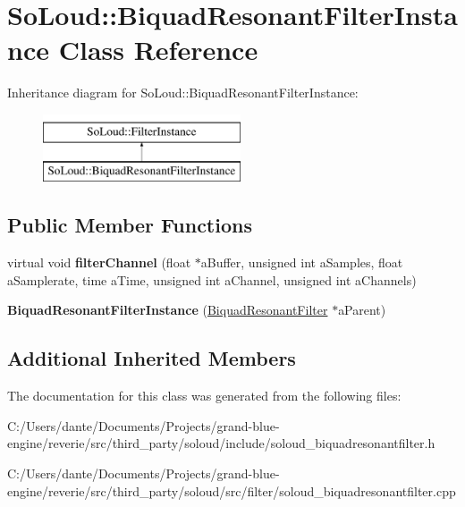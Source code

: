 \hypertarget{class_so_loud_1_1_biquad_resonant_filter_instance}{}\section{So\+Loud\+::Biquad\+Resonant\+Filter\+Instance Class Reference}
\label{class_so_loud_1_1_biquad_resonant_filter_instance}
Inheritance diagram for So\+Loud\+::Biquad\+Resonant\+Filter\+Instance\+:\begin{figure}[H]
\begin{center}
\leavevmode
\includegraphics[height=2.000000cm]{class_so_loud_1_1_biquad_resonant_filter_instance}
\end{center}
\end{figure}
\subsection*{Public Member Functions}
\begin{DoxyCompactItemize}
\item 
\mbox{\label{class_so_loud_1_1_biquad_resonant_filter_instance_a1252db79c00fe979dfafadb534d4c367}} 
virtual void {\bfseries filter\+Channel} (float $\ast$a\+Buffer, unsigned int a\+Samples, float a\+Samplerate, time a\+Time, unsigned int a\+Channel, unsigned int a\+Channels)
\item 
\mbox{\label{class_so_loud_1_1_biquad_resonant_filter_instance_a2261a84c040a0ab189fb631a6dc87ab0}} 
{\bfseries Biquad\+Resonant\+Filter\+Instance} (\mbox{\hyperlink{class_so_loud_1_1_biquad_resonant_filter}{Biquad\+Resonant\+Filter}} $\ast$a\+Parent)
\end{DoxyCompactItemize}
\subsection*{Additional Inherited Members}


The documentation for this class was generated from the following files\+:\begin{DoxyCompactItemize}
\item 
C\+:/\+Users/dante/\+Documents/\+Projects/grand-\/blue-\/engine/reverie/src/third\+\_\+party/soloud/include/soloud\+\_\+biquadresonantfilter.\+h\item 
C\+:/\+Users/dante/\+Documents/\+Projects/grand-\/blue-\/engine/reverie/src/third\+\_\+party/soloud/src/filter/soloud\+\_\+biquadresonantfilter.\+cpp\end{DoxyCompactItemize}

